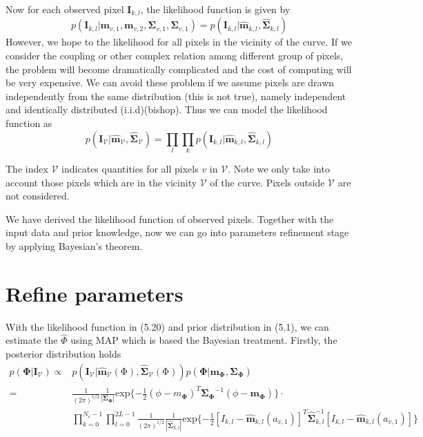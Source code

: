 Now for each observed pixel $\mathbf{I}_{k,l}$, the likelihood
function is given by
\begin{equation}
  \label{eq:5.19}
p(\mathbf{I}_{k,l} | \mathbf{m}_{v,1}, \mathbf{m}_{v,2},
  \mathbf{\Sigma}_{v,1}, \mathbf{\Sigma}_{v,1}) = p(\mathbf{I}_{k,l} | \hat{\mathbf{\mathbf{m}}}_{k,l},\hat{\mathbf{\mathbf{\Sigma}}}_{k,l}) 
\end{equation}
However, we hope to the likelihood for all pixels in the vicinity of
the curve. If we consider the coupling or other complex relation among
different group of pixels, the problem will become dramatically
complicated and the cost of computing will be very expensive. We can
avoid these problem if we assume pixels are drawn independently from the same distribution
(this is not true), namely independent and identically distributed
(i.i.d)(bishop). Thus we can model the likelihood function as
\begin{equation}
  \label{eq:5.20}
  p(\mathbf{I}_{\mathcal{V}} |
  \hat{\mathbf{\mathbf{m}}}_{\mathcal{V}},\hat{\mathbf{\mathbf{\Sigma}}}_{\mathcal{V}})
  = \prod_l \prod_k p(\mathbf{I}_{k,l} | \hat{\mathbf{\mathbf{m}}}_{k,l},\hat{\mathbf{\mathbf{\Sigma}}}_{k,l}) 
\end{equation}

The index $\mathcal{V}$ indicates quantities for all pixels $v$ in
$\mathcal{V}$. Note we only take into account those pixels which are
in the vicinity $\mathcal{V}$ of the curve. Pixels outside
$\mathcal{V}$ are not considered.

We have derived the likelihood function of observed pixels. Together
with the input data and prior knowledge, now we can go into parameters
refinement stage by applying Bayesian's theorem.

\section{Refine parameters}
\label{sec:ref}

With the likelihood function in (5.20) and prior distribution in
(5.1), we can estimate the $\hat{\Phi}$ using MAP which is based the
Bayesian treatment.
Firstly, the posterior distribution holds
\begin{align}
    p(\mathbf{\Phi}|\mathbf{\mathbf{I}}_{\mathcal{V}}) 
    \propto &
    p(\mathbf{\mathbf{I}_{\mathcal{V}}}
    |\hat{\mathbf{\mathbf{m}}}_{\mathcal{V}}(\mathrm{\Phi}),\hat{\mathbf{\mathbf{\Sigma}}}_{\mathcal{V}}(\mathrm{\Phi}))p(\mathbf{\Phi}
    | \mathbf{m}_{\mathbf{\Phi}},
    \mathbf{\mathbf{\Sigma}}_{\mathbf{\Phi}})\nonumber\\
    = & {\frac{1}{{(2\pi)}^{1/2}}}
      \frac{1}{|\mathbf{\Sigma}_{\mathbf{\Phi}}|}
      \mathrm{exp}\{-\frac{1}{2}{(\phi-m_{\mathbf{\Phi}})^T{\mathbf{\Sigma}_{\mathbf{\Phi}}}^{-1}(\phi-\mathbf{m}_{\mathbf{\Phi}})}\}\cdot
    \nonumber\\ 
    & \prod_{k = 0}^{N_{c}-1} \prod_{l=0}^{2L-1}{\frac{1}{(2\pi)^{1/2}}
        \frac{1}{|\hat{\mathbf{\Sigma}}_{k,l}|} \mathrm{exp}\{-\frac{1}{2}
        {\left[I_{k,l}-\hat{\mathbf{m}}_{k,l}(a_{v,1})\right]^T\hat{\mathbf{\Sigma}}_{k,l}^{-1}\left[I_{k,l}-\hat{\mathbf{m}}_{k,l}(a_{v,1})\right]}
      }\}
\end{align}

